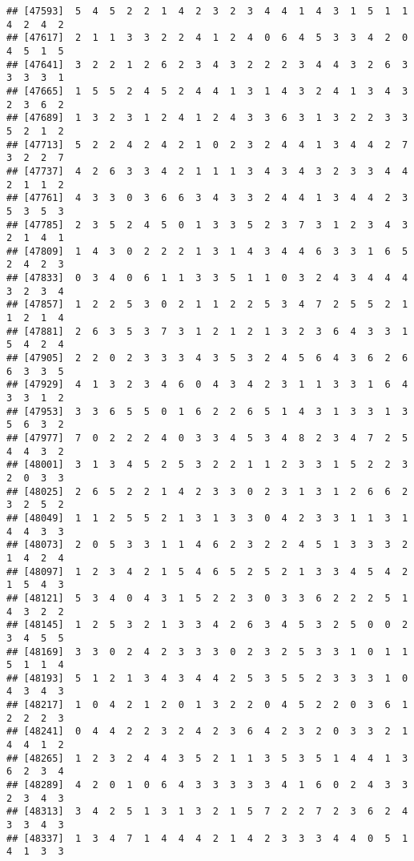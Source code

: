 \documentclass[
]{article}
\begin{document}
\begin{verbatim}
## [47593]  5  4  5  2  2  1  4  2  3  2  3  4  4  1  4  3  1  5  1  1  4  2  4  2
## [47617]  2  1  1  3  3  2  2  4  1  2  4  0  6  4  5  3  3  4  2  0  4  5  1  5
## [47641]  3  2  2  1  2  6  2  3  4  3  2  2  2  3  4  4  3  2  6  3  3  3  3  1
## [47665]  1  5  5  2  4  5  2  4  4  1  3  1  4  3  2  4  1  3  4  3  2  3  6  2
## [47689]  1  3  2  3  1  2  4  1  2  4  3  3  6  3  1  3  2  2  3  3  5  2  1  2
## [47713]  5  2  2  4  2  4  2  1  0  2  3  2  4  4  1  3  4  4  2  7  3  2  2  7
## [47737]  4  2  6  3  3  4  2  1  1  1  3  4  3  4  3  2  3  3  4  4  2  1  1  2
## [47761]  4  3  3  0  3  6  6  3  4  3  3  2  4  4  1  3  4  4  2  3  5  3  5  3
## [47785]  2  3  5  2  4  5  0  1  3  3  5  2  3  7  3  1  2  3  4  3  2  1  4  1
## [47809]  1  4  3  0  2  2  2  1  3  1  4  3  4  4  6  3  3  1  6  5  2  4  2  3
## [47833]  0  3  4  0  6  1  1  3  3  5  1  1  0  3  2  4  3  4  4  4  3  2  3  4
## [47857]  1  2  2  5  3  0  2  1  1  2  2  5  3  4  7  2  5  5  2  1  1  2  1  4
## [47881]  2  6  3  5  3  7  3  1  2  1  2  1  3  2  3  6  4  3  3  1  5  4  2  4
## [47905]  2  2  0  2  3  3  3  4  3  5  3  2  4  5  6  4  3  6  2  6  6  3  3  5
## [47929]  4  1  3  2  3  4  6  0  4  3  4  2  3  1  1  3  3  1  6  4  3  3  1  2
## [47953]  3  3  6  5  5  0  1  6  2  2  6  5  1  4  3  1  3  3  1  3  5  6  3  2
## [47977]  7  0  2  2  2  4  0  3  3  4  5  3  4  8  2  3  4  7  2  5  4  4  3  2
## [48001]  3  1  3  4  5  2  5  3  2  2  1  1  2  3  3  1  5  2  2  3  2  0  3  3
## [48025]  2  6  5  2  2  1  4  2  3  3  0  2  3  1  3  1  2  6  6  2  3  2  5  2
## [48049]  1  1  2  5  5  2  1  3  1  3  3  0  4  2  3  3  1  1  3  1  4  4  3  3
## [48073]  2  0  5  3  3  1  1  4  6  2  3  2  2  4  5  1  3  3  3  2  1  4  2  4
## [48097]  1  2  3  4  2  1  5  4  6  5  2  5  2  1  3  3  4  5  4  2  1  5  4  3
## [48121]  5  3  4  0  4  3  1  5  2  2  3  0  3  3  6  2  2  2  5  1  4  3  2  2
## [48145]  1  2  5  3  2  1  3  3  4  2  6  3  4  5  3  2  5  0  0  2  3  4  5  5
## [48169]  3  3  0  2  4  2  3  3  3  0  2  3  2  5  3  3  1  0  1  1  5  1  1  4
## [48193]  5  1  2  1  3  4  3  4  4  2  5  3  5  5  2  3  3  3  1  0  4  3  4  3
## [48217]  1  0  4  2  1  2  0  1  3  2  2  0  4  5  2  2  0  3  6  1  2  2  2  3
## [48241]  0  4  4  2  2  3  2  4  2  3  6  4  2  3  2  0  3  3  2  1  4  4  1  2
## [48265]  1  2  3  2  4  4  3  5  2  1  1  3  5  3  5  1  4  4  1  3  6  2  3  4
## [48289]  4  2  0  1  0  6  4  3  3  3  3  3  4  1  6  0  2  4  3  3  2  3  4  3
## [48313]  3  4  2  5  1  3  1  3  2  1  5  7  2  2  7  2  3  6  2  4  3  3  4  3
## [48337]  1  3  4  7  1  4  4  4  2  1  4  2  3  3  3  4  4  0  5  1  4  1  3  3

\end{verbatim}
\end{document}
